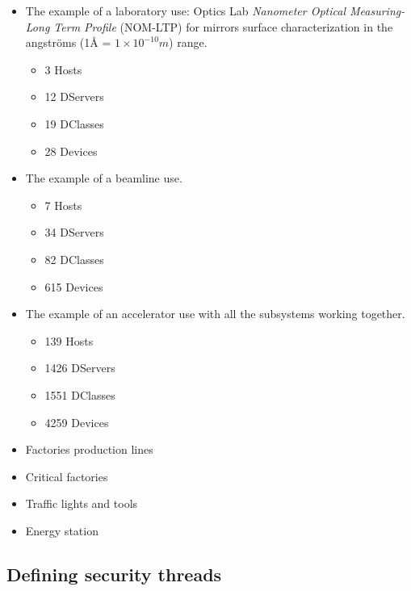 \documentclass[10pt,a4paper,twoside]{llncs}
\begin{document}
\begin{itemize}
    \item The example of a laboratory use: Optics Lab \emph{Nanometer Optical Measuring-Long Term Profile} (NOM-LTP) for mirrors surface characterization in the angstr\"oms (1\AA{} = $1\times10^{-10}m$) range.
    \begin{itemize}
        \item 3 Hosts
        \item 12 DServers
        \item 19 DClasses
        \item 28 Devices
    \end{itemize}
    \item The example of a beamline use.
    \begin{itemize}
        \item 7 Hosts
        \item 34 DServers
        \item 82 DClasses
        \item 615 Devices
    \end{itemize}
    \item The example of an accelerator use with all the subsystems working together.
    \begin{itemize}
        \item 139 Hosts
        \item 1426 DServers
        \item 1551 DClasses
        \item 4259 Devices
    \end{itemize}
    \item Factories production lines
    \item Critical factories
    \item Traffic lights and tools
    \item Energy station
\end{itemize}

\subsection{Defining security threads \label{sec:securityThreads}}
\end{document}
